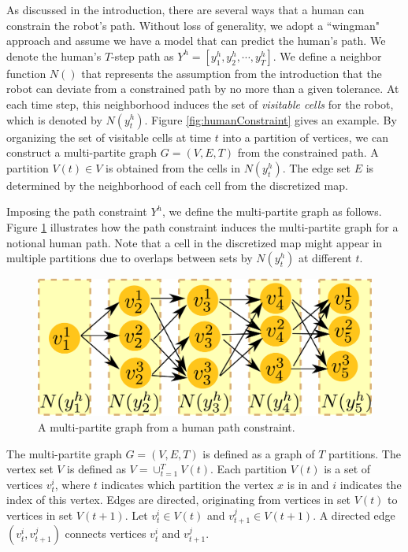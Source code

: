 As discussed in the introduction, there are several ways that a human can constrain the robot's path.
Without loss of generality, we adopt a ``wingman" approach and assume we have a model that can predict the human's path.
We denote the human's $T$-step path as $ Y^{h} = [y^{h}_{1}, y^{h}_{2} , \cdots , y^{h}_{T}] $.
We define a neighbor function $ N () $ that represents the assumption from the introduction that the robot can deviate from a constrained path by no more than a given tolerance.  
At each time step, this neighborhood induces the set of {\em visitable cells} for the robot, which is denoted by $ N( y^{h}_{t} ) $.
Figure \ref{fig:humanConstraint} gives an example.
By organizing the set of visitable cells at time $ t $ into a partition of vertices, we can construct a multi-partite graph $ G = (V, E, T) $ from the constrained path.
A partition $ V(t) \in V $ is obtained from the cells in $ N( y^{h}_{t} ) $.
The edge set $ E $ is determined by the neighborhood of each cell from the discretized map.

Imposing the path constraint $ Y^{h} $, we define the multi-partite graph as follows.
Figure \ref{fig:MultiPartite} illustrates how the path constraint induces the multi-partite graph for a notional human path.
Note that a cell in the discretized map might appear in multiple partitions due to overlaps between sets by $ N( y^{h}_{t} ) $ at different $ t $.

\begin{figure}[htbp]
\centering
\includegraphics[width=0.6\linewidth]{./images/MultiPartite.pdf}
\caption{A multi-partite graph from a human path constraint.}
\label{fig:MultiPartite}
\end{figure}

\begin{mydef}
\label{def:multi_partite}
The multi-partite graph $ G = (V, E, T) $ is defined as a graph of $ T $ partitions. 
The vertex set $ V $ is defined as $ V = \cup_{t=1}^{T} V(t) $.
Each partition $ V(t) $ is a set of vertices $ v^{i}_{t} $, where $ t $ indicates which partition the vertex $ x $ is in and $ i $ indicates the index of this vertex.
Edges are directed, originating from vertices in set $ V(t) $ to vertices in set $ V(t+1) $.
Let $ v^{i}_{t} \in V(t) $ and $ v^{j}_{t+1} \in V(t+1) $.
A directed edge $ (v^{i}_{t}, v^{j}_{t+1}) $ connects vertices $ v^{i}_{t} $ and $ v^{j}_{t+1} $. 
\end{mydef}


